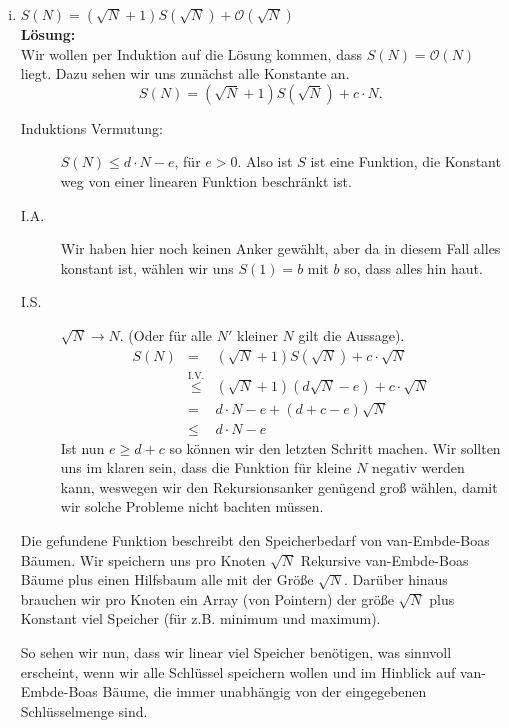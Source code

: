 \documentclass[11pt,a4paper,ngerman]{article}
\begin{document}
\begin{enumerate}[(i)]
	\item $S(N) = \left( \sqrt{N} + 1 \right) S( \sqrt{N}) + \mathcal{O}(\sqrt{N})$\\
	\noindent\textbf{Lösung:}\\
		Wir wollen per Induktion auf die Lösung kommen, dass $S(N) = \mathcal{O}(N)$ liegt. Dazu sehen wir uns zunächst alle Konstante
		an.
		$$
			S(N) = (\sqrt{N} + 1 ) S( \sqrt{N}) + c \cdot N.
		$$
		\begin{description}
			\item[Induktions Vermutung:] $S(N) \leq d \cdot N - e$, für $e > 0$. Also ist $S$ ist eine Funktion, die Konstant weg
			von einer linearen Funktion beschränkt ist.
			\item[I.A.] Wir haben hier noch keinen Anker gewählt, aber da in diesem Fall alles konstant ist, wählen wir uns
				$S(1) = b$ mit $b$ so, dass alles hin haut.
			\item[I.S.] $\sqrt{N} \rightarrow N$. (Oder für alle $N'$ kleiner $N$ gilt die Aussage).\\
				$$\begin{array}{rcl}
					S(N) &=& (\sqrt{N} + 1) S(\sqrt{N}) + c \cdot \sqrt{N}\\
						&\stackrel{\text{I.V.}}{\leq}& (\sqrt{N} + 1) (d \sqrt{N} - e) + c \cdot \sqrt{N}\\
						&=& d \cdot N - e + (d + c - e) \sqrt{N}\\
						&\leq& d \cdot N - e
				\end{array}$$
				Ist nun $e \geq d +c$ so können wir den letzten Schritt machen. Wir sollten uns im klaren sein,
				dass die Funktion für kleine $N$ negativ werden kann, weswegen wir den Rekursionsanker genügend groß
				wählen, damit wir solche Probleme nicht bachten müssen.
		\end{description}

		Die gefundene Funktion beschreibt den Speicherbedarf von van-Embde-Boas Bäumen. Wir speichern uns pro Knoten
		$\sqrt{N}$ Rekursive van-Embde-Boas Bäume plus einen Hilfsbaum alle mit der Größe $\sqrt{N}$. Darüber hinaus
		brauchen wir pro Knoten ein Array (von Pointern) der größe $\sqrt{N}$ plus Konstant viel Speicher (für z.B. minimum und maximum).
		
		So sehen wir nun, dass wir linear viel Speicher benötigen, was sinnvoll erscheint, wenn wir alle Schlüssel speichern wollen und im Hinblick
		auf van-Embde-Boas Bäume, die immer unabhängig von der eingegebenen Schlüsselmenge sind.
\end{enumerate}
\end{document}
